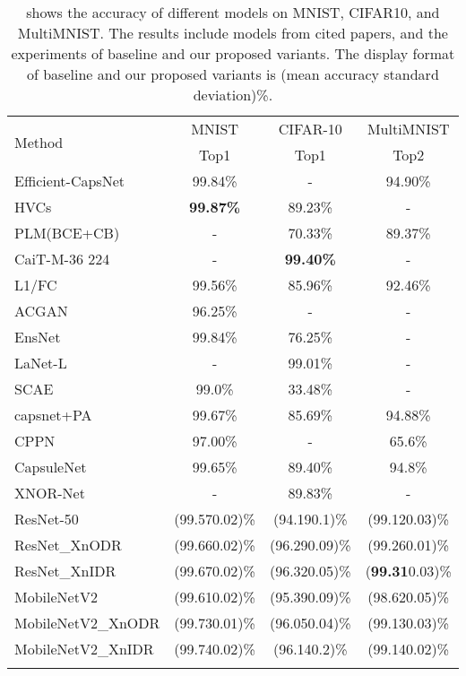 \documentclass[sn-mathphys,iicol,Numbered]{sn-jnl}
\begin{document}
\begin{table*} [ht]
\centering
\caption{shows the accuracy of different models on MNIST, CIFAR10, and MultiMNIST. The results include models from cited papers, and the experiments of baseline and our proposed variants. The display format of baseline and our proposed variants is (mean accuracy  standard deviation)\%.}
\begin{tabular}{l|c|c|c}
\toprule
\multirow{2}{*}{Method} & MNIST & CIFAR-10 & MultiMNIST \\
\cmidrule{2-4}
& Top1 & Top1 & Top2 \\
\midrule
Efficient-CapsNet~\citep{A7_efcaps} & 99.84\% & - & 94.90\% \\ 
HVCs~\citep{A8_hvcs} & \textbf{99.87\%} & 89.23\% & - \\
PLM(BCE+CB)~\citep{A12_plm} & - & 70.33\% & 89.37\% \\
CaiT-M-36  224~\citep{A6_cifar10sota_extra} & - & \textbf{99.40\%} & - \\
L1/FC~\citep{A13_rtdis_caps} & 99.56\% & 85.96\% & 92.46\% \\
ACGAN~\citep{A59_ACGAN} & 96.25\% & - & - \\
EnsNet~\citep{A9_ensnet} & 99.84\% & 76.25\% & - \\ 
LaNet-L~\citep{A5_cifar10sota} & - & 99.01\% & - \\
SCAE~\citep{A10_scae} & 99.0\% & 33.48\% & - \\
capsnet+PA~\citep{A14_capsPA} & 99.67\% & 85.69\% & 94.88\% \\
CPPN~\citep{A11_cvae} & 97.00\% & - & 65.6\% \\
CapsuleNet~\citep{A1_caps} & 99.65\% & 89.40\% & 94.8\% \\
XNOR-Net~\citep{A2_xnor} & - & 89.83\% & - \\
\midrule
ResNet-50 & (99.570.02)\% & (94.190.1)\% & (99.120.03)\%\\
ResNet\_XnODR & (99.660.02)\% & (96.290.09)\% & (99.260.01)\%\\
ResNet\_XnIDR & (99.670.02)\% & (96.320.05)\% & (\textbf{99.31}0.03)\% \\
MobileNetV2 & (99.610.02)\% & (95.390.09)\% & (98.620.05)\% \\
MobileNetV2\_XnODR & (99.730.01)\% & (96.050.04)\% & (99.130.03)\% \\
MobileNetV2\_XnIDR & (99.740.02)\% & (96.140.2)\% & (99.140.02)\% \\
\botrule
\end{tabular} 
\label{tab:all-acc}
\end{table*}
\end{document}

